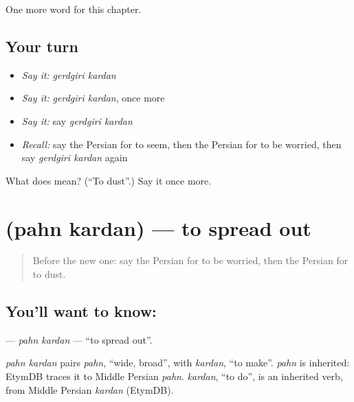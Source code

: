 \begin{grammarlens}[title={What you've built}]
One more word for this chapter.
\end{grammarlens}

\subsection*{Your turn}
\begin{itemize}
\raggedright
  \item \emph{Say it:} \emph{gerdgiri kardan}
  \item \emph{Say it:} \emph{gerdgiri kardan}, once more
  \item \emph{Say it:} say \emph{gerdgiri kardan}
  \item \emph{Recall:} say the Persian for to seem, then the Persian for to be worried, then say \emph{gerdgiri kardan} again
\end{itemize}

\begin{tcolorbox}[breakable,colback=teal!4,colframe=teal!35!black,title={Before you move on}]
What does   mean? (\textquotedblleft{}To dust\textquotedblright{}.) Say it once more.
\end{tcolorbox}
\section[\texorpdfstring{\fa{پهن} \fa{کردن} (pahn kardan)}{پهن کردن (pahn kardan)}]{  (pahn kardan) — to spread out}

\label{lesson:FA-C147-pahn-kardan}



\begin{quote}
Before the new one: say the Persian for to be worried, then the Persian for to dust.
\end{quote}

\subsection*{You'll want to know:  }
\textbf{ } — \emph{pahn kardan} — \textquotedblleft{}to spread out\textquotedblright{}.

\begin{cousinweb}
\emph{pahn kardan} pairs \emph{pahn}, \textquotedblleft{}wide, broad\textquotedblright{}, with \emph{kardan}, \textquotedblleft{}to make\textquotedblright{}. \emph{pahn} is inherited: EtymDB traces it to Middle Persian \emph{pahn}. \emph{kardan}, \textquotedblleft{}to do\textquotedblright{}, is an inherited verb, from Middle Persian \emph{kardan} (EtymDB).
\end{cousinweb}

